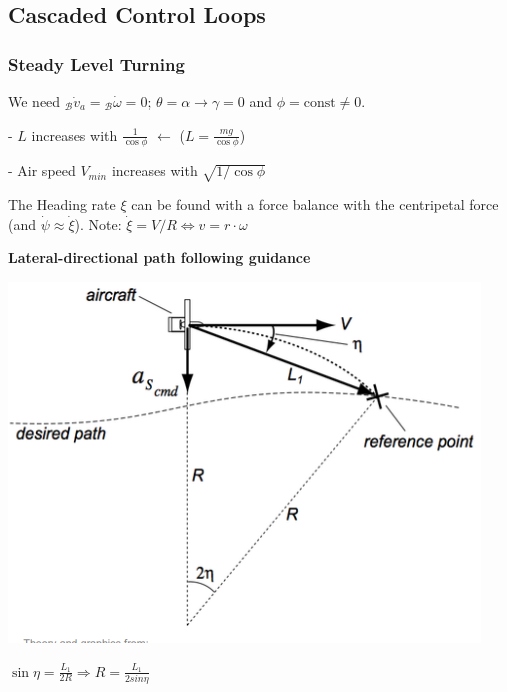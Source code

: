 \documentclass[fontsize=6pt,DIV=calc,a4paper,ngerman]{scrartcl}
\begin{document}
\begin{multicols*}{4}
	\subsection{Cascaded Control Loops}
	\subsubsection{Steady Level Turning}
	We need ${}_\mathcal{B}\dot{v}_a = {}_\mathcal{B}\dot{\omega}=0$;
	$\theta = \alpha \rightarrow \gamma = 0$ and $\phi = \text{const} \neq 0$.

	- $L$ increases with $\frac{1}{\cos\phi}$ \quad $\leftarrow$ ($ L = \frac{mg}{\cos\phi} $)

	- Air speed $V_{min}$ increases with $\sqrt{1/\cos\phi}$ %

	The Heading rate $\xi$ can be found with a force balance with the centripetal force (and $\dot{\psi}\approx \dot{\xi}$). Note: $\dot{\xi} = V/R \Leftrightarrow v=r\cdot \omega $

	\textbf{Lateral-directional path following guidance}\\
	\begin{minipage}{0.5\linewidth}
		\includegraphics[width=\linewidth]{lateral.png}
	\end{minipage}
	\begin{minipage}{0.5\linewidth}
		$\sin\eta = \frac{L_1}{2R} \Rightarrow R= \frac{L_1}{2sin\eta}$


\end{minipage}
\end{multicols*}
\end{document}
